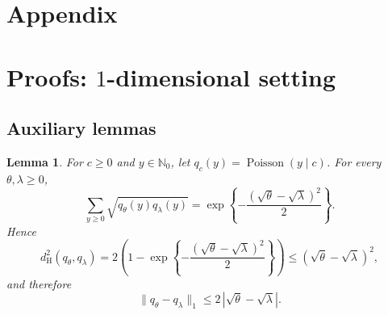 \documentclass[twoside,12pt]{article}
\newtheorem{lem}[thm]{Lemma}
\begin{document}
{}
\section*{Appendix}

\appendix

\renewcommand{\thesection}{\Alph{section}}
\renewcommand{\theequation}{\thesection.\arabic{equation}}
\renewcommand{\thefigure}{\thesection.\arabic{figure}}
\renewcommand{\thetable}{\thesection.\arabic{table}}

\setcounter{section}{0}
\setcounter{equation}{0}
\setcounter{figure}{0}
\setcounter{table}{0}
\setcounter{thm}{0}




\section{Proofs: $1$-dimensional setting}\label{app1}

\subsection{Auxiliary lemmas}

\begin{lem}\label{lem:Poisson_kernel}
For $c\ge 0$ and $y\in\mathbb N_0$, let $q_c(y)=\operatorname{Poisson}(y\mid c)$. For every $\theta,\lambda\ge 0$,
\begin{displaymath}
\sum_{y\ge 0}\sqrt{q_\theta(y)q_\lambda(y)}=\exp\!\left\{-\frac{(\sqrt{\theta}-\sqrt{\lambda})^2}{2}\right\}.
\end{displaymath}
Hence
\begin{displaymath}
d_{\mathrm H}^2(q_\theta,q_\lambda)=2\left(1-\exp\!\left\{-\frac{(\sqrt{\theta}-\sqrt{\lambda})^2}{2}\right\}\right)\le(\sqrt{\theta}-\sqrt{\lambda})^2,
\end{displaymath}
and therefore
\begin{displaymath}
\|q_\theta-q_\lambda\|_1\le 2\,|\sqrt{\theta}-\sqrt{\lambda}|.
\end{displaymath}
\end{lem}
\end{document}
